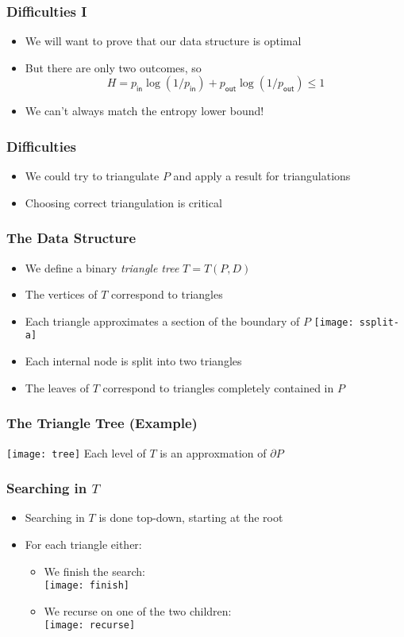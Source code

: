 \documentclass{beamer}
\newcommand{\pin}{p_{\mathsf{in}}}
\newcommand{\pout}{p_{\mathsf{out}}}
\begin{document}
\frame
{
   \frametitle{Difficulties I}
   \begin{itemize}
   \item<1-> We will want to prove that our data structure is optimal
   \item<2-> But there are only two outcomes, so
     \[ H= \pin\log (1/\pin) + \pout\log(1/\pout) \le 1  \]
   \item<3-> We can't always match the entropy lower bound!
   \end{itemize}
}

\frame
{
   \frametitle{Difficulties}
   \begin{itemize}
     \item<1-> We could try to triangulate $P$ and apply a result for 
	triangulations\\
     \item<4-> Choosing correct triangulation is critical
   \end{itemize}
}

\frame
{
   \frametitle{The Data Structure}
   \begin{itemize}
    \item<1-> We define a binary \emph{triangle tree} $T=T(P,D)$
    \item<2-> The vertices of $T$ correspond to triangles
    \item<3-> Each triangle approximates a section of the boundary of $P$
    {\texttt{[image: ssplit-a]}}
    \item<4-> Each internal node is split into two triangles
    \item<8-> The leaves of $T$ correspond to triangles completely
	contained in $P$
   \end{itemize}
}

\frame
{
   \frametitle{The Triangle Tree (Example)}
   \texttt{[image: tree]}
   Each level of $T$ is an approxmation of $\partial P$
}


\frame
{
   \frametitle{Searching in $T$}
   \begin{itemize}
     \item<1-> Searching in $T$ is done top-down, starting at the root
     \item<2-> For each triangle either:
      \begin{itemize}
        \item<3-> We finish the search:\\
          \texttt{[image: finish]}
        \item<4-> We recurse on one of the two children:\\
          \texttt{[image: recurse]}
      \end{itemize}
   \end{itemize}
}
\end{document}
